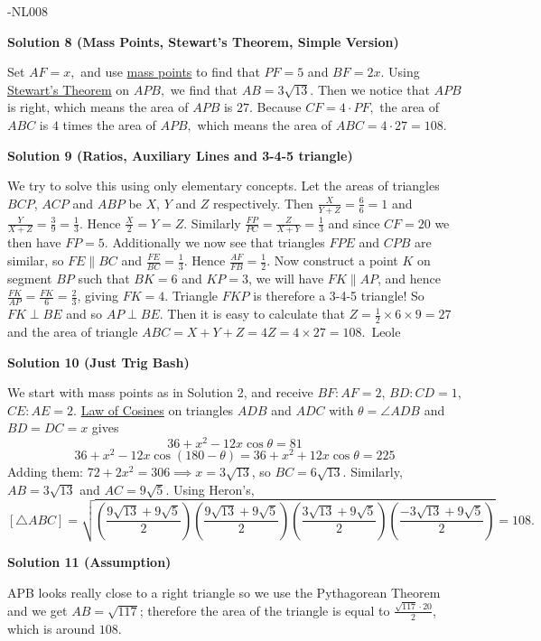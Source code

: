 \begin{enumerate}
 -NL008

 



\textbf{Solution 8 (Mass Points, Stewart's Theorem, Simple Version)}

Set $AF=x,$ and use \href{https://artofproblemsolving.com/wiki/index.php?title=Mass\_points}{mass points} to find that $PF=5$ and $BF=2x.$ Using \href{https://artofproblemsolving.com/wiki/index.php?title=Stewart\%27s\_Theorem}{Stewart's Theorem} on $APB,$ we find that $AB=3\sqrt{13}.$ Then we notice that $APB$ is right, which means the area of $APB$ is $27.$ Because $CF=4\cdot PF,$ the area of $ABC$ is $4$ times the area of $APB,$ which means the area of $ABC=4\cdot 27=\boxed{108}.$




\textbf{Solution 9 (Ratios, Auxiliary Lines and 3-4-5 triangle)}

We try to solve this using only elementary concepts. Let the areas of triangles $BCP$, $ACP$ and $ABP$ be $X$, $Y$ and $Z$ respectively. Then $\frac{X}{Y+Z}=\frac{6}{6}=1$ and $\frac{Y}{X+Z}=\frac{3}{9}=\frac{1}{3}$. Hence $\frac{X}{2}=Y=Z$. Similarly $\frac{FP}{PC}=\frac{Z}{X+Y}=\frac{1}{3}$ and since $CF=20$ we then have $FP=5$. Additionally we now see that triangles $FPE$ and $CPB$ are similar, so $FE \parallel BC$ and $\frac{FE}{BC} = \frac{1}{3}$. Hence $\frac{AF}{FB}=\frac{1}{2}$. Now construct a point $K$ on segment $BP$ such that $BK=6$ and $KP=3$, we will have $FK \parallel AP$, and hence $\frac{FK}{AP} = \frac{FK}{6} = \frac{2}{3}$, giving $FK=4$. Triangle $FKP$ is therefore a 3-4-5 triangle! So $FK \perp BE$ and so $AP \perp BE$. Then it is easy to calculate that $Z = \frac{1}{2} \times 6 \times 9 = 27$ and the area of triangle $ABC = X+Y+Z = 4Z = 4 \times 27 = \boxed{108}$.~Leole

 


 



\textbf{Solution 10 (Just Trig Bash)}

We start with mass points as in Solution 2, and receive $BF:AF = 2$, $BD:CD = 1$, $CE:AE = 2$. \href{https://artofproblemsolving.com/wiki/index.php?title=Law\_of\_Cosines}{Law of Cosines} on triangles $ADB$ and $ADC$ with $\theta = \angle ADB$ and $BD=DC=x$ gives
 \[36+x^2-12x\cos \theta = 81\]
 \[36+x^2-12x\cos (180-\theta) = 36+x^2+12x\cos \theta = 225\]Adding them: $72+2x^2=306 \implies x=3\sqrt{13}$, so $BC = 6\sqrt{13}$. Similarly, $AB = 3\sqrt{13}$ and $AC = 9\sqrt{5}$. Using Heron's,
 \[[ \triangle ABC ]= \sqrt{\left(\dfrac{9\sqrt{13}+9\sqrt{5}}{2}\right)\left(\dfrac{9\sqrt{13}+9\sqrt{5}}{2}\right)\left(\dfrac{3\sqrt{13}+9\sqrt{5}}{2}\right)\left(\dfrac{-3\sqrt{13}+9\sqrt{5}}{2}\right)} = \boxed{108}.\]




\textbf{Solution 11 (Assumption)}

APB looks really close to a right triangle so we use the Pythagorean Theorem and we get $AB=\sqrt{117}$; therefore the area of the triangle is equal to $\frac{\sqrt{117}\cdot 20}{2}$, which is around $\boxed{108}$.

 


 


\end{enumerate}